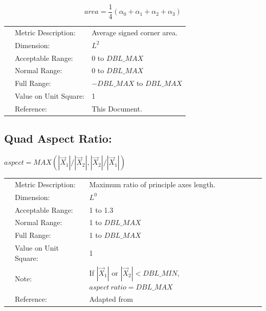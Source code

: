 \documentclass[12pt]{article}
\begin{document}
\begin{displaymath}
area = \frac {1} {4} ( \alpha_0 + \alpha_1 + \alpha_2 + \alpha_3 )
\end{displaymath}

\begin{tabular}{lll}
& Metric Description:  & Average signed corner area. \\ 
& Dimension:           & $L^2$                   \\ 
& Acceptable Range:    & 0 to $DBL\_MAX$ \\ 
& Normal Range:        & 0 to $DBL\_MAX$ \\ 
& Full Range:          & $-DBL\_MAX$ to $DBL\_MAX$                       \\ 
& Value on Unit Square:& 1 \\
& Reference:           &  This Document. \\
\end{tabular} 


\subsection*{Quad Aspect Ratio:}

\begin{center}
$aspect = MAX \left(  \left| \vec X_1 \right| / \left| \vec X_2 \right|, 
                            \left| \vec X_2 \right| / \left| \vec X_1 \right| \right)  $
\end{center} 

\begin{tabular}{lll}
& Metric Description:  & Maximum ratio of principle axes length. \\
& Dimension:           & $L^0$              \\ 
& Acceptable Range:    & 1 to 1.3               \\ 
& Normal Range:        & 1 to $DBL\_MAX$                      \\ 
& Full Range:          & 1 to $DBL\_MAX$ \\ 
& Value on Unit Square:& 1 \\
& Note:                & If $|\vec X_1|$ or $|\vec X_2| < DBL\_MIN$, $aspect~ratio = DBL\_MAX$  \\
& Reference:           & Adapted from \cite{one} \\
 
\end{tabular} 
\end{document}
